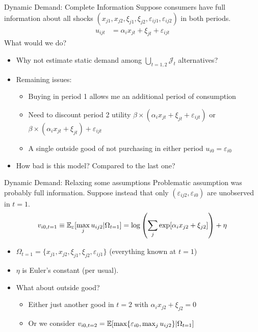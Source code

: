 \begin{frame}{Dynamic Demand: Complete Information}
Suppose consumers have full information about all shocks $(x_{j1},x_{j2},\xi_{j1},\xi_{j2},\varepsilon_{ij1},\varepsilon_{ij2})$ in both periods. 
\begin{align*}
u_{ijt} &=   \alpha_i x_{jt}  +  \xi_{jt} + \varepsilon_{ijt}
\end{align*}
What would we do?
\begin{itemize}
\item Why not estimate static demand among $\bigcup_{t=1,2}  \mathcal{J}_t $ alternatives?
\item Remaining issues:
\begin{itemize}
\item Buying in period 1 allows me an additional period of consumption
\item Need to discount period 2 utility $\beta \times ( \alpha_i x_{jt}  +  \xi_{jt} + \varepsilon_{ijt})$ or $\beta \times ( \alpha_i x_{jt}  +  \xi_{jt} )+\varepsilon_{ijt}$
\item A single outside good of not purchasing in either period $ u_{i0} =  \varepsilon_{i0} $
\end{itemize}
\item How bad is this model? Compared to the last one?
\end{itemize}
\end{frame}



\begin{frame}{Dynamic Demand: Relaxing some assumptions}
Problematic assumption was probably full information. Suppose instead that only $(\varepsilon_{ij2},\varepsilon_{i0})$ are \alert{unobserved} in $t=1$. 
\begin{align*}
v_{i0,t=1} \equiv \mathbb{E}_{\varepsilon} [\max_j u_{ij2} | \Omega_{t=1} ] = \log \left( \sum_j \exp [ \alpha_i x_{j2}  +  \xi_{j2} ] \right) + \eta
\end{align*}
\begin{itemize}
\item $\Omega_{t=1}= \{x_{j1},x_{j2},\xi_{j1},\xi_{j2},\varepsilon_{ij1}\}$ (everything known at $t=1$) 
\item $\eta$ is Euler's constant (per usual).
\item What about outside good?
\begin{itemize}
\item Either just another good in $t=2$ with $\alpha_i x_{j2}+ \xi_{j2} = 0$
\item Or we consider $v_{i0,t=2}=\mathbb{E} [\max \{ \varepsilon_{i0}, \max_j u_{ij2} \}  | \Omega_{t=1}]$
\end{itemize}
\end{itemize}
\end{frame}

